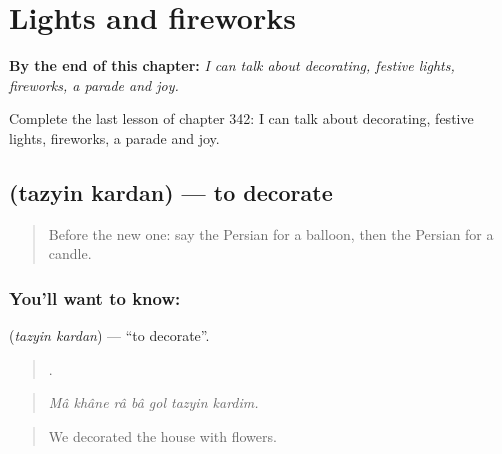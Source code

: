 
\chapter{Lights and fireworks}
\label{ch:fa-lights-and-fireworks}

\begin{chapteropening}
\textbf{By the end of this chapter:} \emph{I can talk about decorating, festive lights, fireworks, a parade and joy.}

Complete the last lesson of chapter 342: I can talk about decorating, festive lights, fireworks, a parade and joy.
\end{chapteropening}

\section[\texorpdfstring{\fa{تزیین} \fa{کردن} (tazyin kardan)}{تزیین کردن (tazyin kardan)}]{  (tazyin kardan) — to decorate}

\label{lesson:FA-C342-tazyin-kardan}



\begin{quote}
Before the new one: say the Persian for a balloon, then the Persian for a candle.
\end{quote}

\subsection*{You'll want to know:  }
\textbf{ } (\emph{tazyin kardan}) — \textquotedblleft{}to decorate\textquotedblright{}.

\begin{quote}
      .
\end{quote}

\begin{quote}
\emph{Mâ khâne râ bâ gol tazyin kardim.}
\end{quote}

\begin{quote}
We decorated the house with flowers.
\end{quote}

